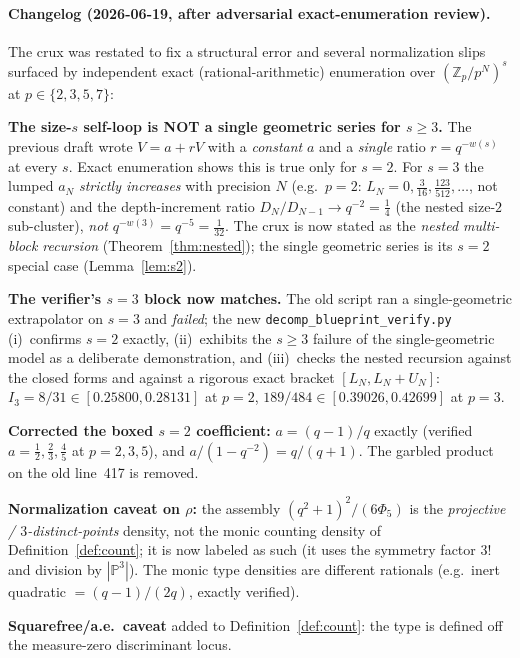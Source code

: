 \documentclass[11pt]{article}
\theoremstyle{definition}
\theoremstyle{remark}
\newcommand{\Zp}{\mathbb{Z}_p}
\newcommand{\rhocount}{\rho}
\begin{document}
\paragraph{Changelog (2026-06-19, after adversarial exact-enumeration review).}
The crux was restated to fix a structural error and several normalization slips
surfaced by independent exact (rational-arithmetic) enumeration over $(\Zp/p^N)^s$
at $p\in\{2,3,5,7\}$:
\begin{enumerate}[label=\textup{[F\arabic*]},nosep,leftmargin=*]
\item\textbf{The size-$s$ self-loop is NOT a single geometric series for $s\ge3$.}
The previous draft wrote $V=a+rV$ with a \emph{constant} $a$ and a \emph{single}
ratio $r=q^{-w(s)}$ at every $s$. Exact enumeration shows this is true only for
$s=2$. For $s=3$ the lumped $a_N$ \emph{strictly increases} with precision $N$
(e.g.\ $p{=}2$: $L_N=0,\tfrac3{16},\tfrac{123}{512},\dots$, not constant) and the
depth-increment ratio $D_N/D_{N-1}\to q^{-2}=\tfrac14$ (the nested size-$2$
sub-cluster), \emph{not} $q^{-w(3)}=q^{-5}=\tfrac1{32}$. The crux is now stated as
the \emph{nested multi-block recursion} (Theorem~\ref{thm:nested}); the single
geometric series is its $s=2$ special case (Lemma~\ref{lem:s2}).
\item\textbf{The verifier's $s=3$ block now matches.} The old script ran a
single-geometric extrapolator on $s=3$ and \emph{failed}; the new
\texttt{decomp\_blueprint\_verify.py} (i)~confirms $s=2$ exactly, (ii)~exhibits
the $s\ge3$ failure of the single-geometric model as a deliberate demonstration,
and (iii)~checks the nested recursion against the closed forms and against a
rigorous exact bracket $[L_N,L_N+U_N]$: $I_3=8/31\in[0.25800,0.28131]$ at $p{=}2$,
$189/484\in[0.39026,0.42699]$ at $p{=}3$.
\item\textbf{Corrected the boxed $s=2$ coefficient:} $a=(q-1)/q$ exactly
(verified $a=\tfrac12,\tfrac23,\tfrac45$ at $p=2,3,5$), and $a/(1-q^{-2})=q/(q+1)$.
The garbled product on the old line~417 is removed.
\item\textbf{Normalization caveat on $\rhocount$:} the assembly
$(q^2+1)^2/(6\Phi_5)$ is the \emph{projective / $3$-distinct-points} density, not
the monic counting density of Definition~\ref{def:count}; it is now labeled as
such (it uses the symmetry factor $3!$ and division by $|\mathbb P^3|$). The monic
type densities are different rationals (e.g.\ inert quadratic
$=(q-1)/(2q)$, exactly verified).
\item\textbf{Squarefree/a.e.\ caveat} added to Definition~\ref{def:count}: the
type is defined off the measure-zero discriminant locus.
\end{enumerate}
\end{document}
